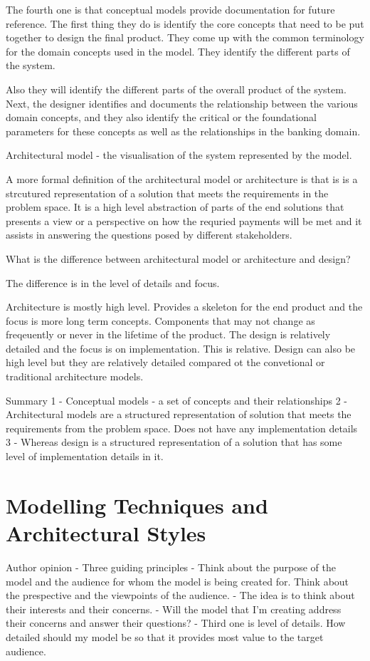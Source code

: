 The fourth one is that conceptual models provide documentation for future reference.
The first thing they do is identify the core concepts that need to be put together to design the final product.
They come up with the common terminology for the domain concepts used in the model.
They identify the different parts of the system.

Also they will identify the different parts of the overall product of the system.
Next, the designer identifies and documents the relationship between the various domain concepts, and they also identify the critical or the foundational parameters for these concepts as well as the relationships in the banking domain.

Architectural model - the visualisation of the system represented by the model.

A more formal definition of the architectural model or architecture is that is is a strcutured representation of a solution that meets the requirements in the problem space.
It is a high level abstraction of parts of the end solutions that presents a view or a perspective on how the requried payments will be met and it assists in answering the questions posed by different stakeholders.

What is the difference between architectural model or architecture and design?

The difference is in the level of details and focus.

Architecture is mostly high level.
Provides a skeleton for the end product and the focus is more long term concepts. Components that may not change as freqeuently or never in the lifetime of the product.
The design is relatively detailed and the focus is on implementation.
This is relative. Design can also be high level but they are relatively detailed compared ot the convetional or traditional architecture models.

Summary
1 - Conceptual models - a set of concepts and their relationships
2 - Architectural models are a structured representation of solution that meets the requirements from the problem space. Does not have any implementation details
3 - Whereas design is a structured representation of a solution that has some level of implementation details in it.

\section{Modelling Techniques and Architectural Styles}
Author opinion
- Three guiding principles
- Think about the purpose of the model and the audience for whom the model is being created for. Think about the prespective and the viewpoints of the audience.
    - The idea is to think about their interests and their concerns.
    - Will the model that I'm creating address their concerns and answer their questions?
- Third one is level of details. How detailed should my model be so that it provides most value to the target audience.

